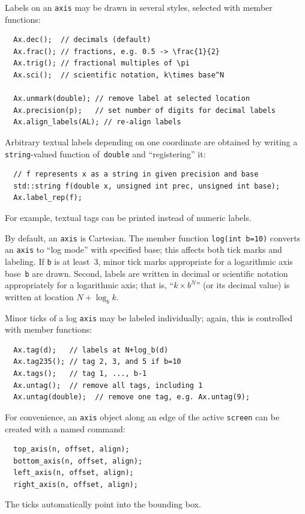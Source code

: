 \documentclass[12pt,letterpaper]{book}
\newcommand{\code}[1]{\texttt{#1}}
\newcommand{\teximath}[1]{$#1$}
\newcommand{\findex}[1]{\ignorespaces}
\begin{document}
Labels on an \code{axis} may be drawn in several styles, selected with
member functions:
\findex{axis.dec}
\findex{axis.frac}
\findex{axis.trig}
\findex{axis.sci}
\findex{axis.unmark}
\findex{axis.precision}
\findex{axis.align\_labels}
\begin{verbatim}
  Ax.dec();  // decimals (default)
  Ax.frac(); // fractions, e.g. 0.5 -> \frac{1}{2}
  Ax.trig(); // fractional multiples of \pi
  Ax.sci();  // scientific notation, k\times base^N

  Ax.unmark(double); // remove label at selected location
  Ax.precision(p);   // set number of digits for decimal labels
  Ax.align_labels(AL); // re-align labels
\end{verbatim}
Arbitrary textual labels depending on one coordinate are obtained by
writing a \code{string}-valued function of~\code{double} and
``registering'' it:
\findex{axis.label\_rep}
\begin{verbatim}
  // f represents x as a string in given precision and base
  std::string f(double x, unsigned int prec, unsigned int base);
  Ax.label_rep(f);
\end{verbatim}
For example, textual tags can be printed instead of numeric labels.

By default, an \code{axis} is Cartesian. The member function
\code{log(int b=10)} converts an \code{axis} to ``log mode'' with
specified base; this affects both tick marks and labeling. If \code{b}
is at least~3, minor tick marks appropriate for a logarithmic axis
base~\code{b} are drawn. Second, labels are written in decimal or
scientific notation appropriately for a logarithmic axis; that is,
``\teximath{k\times b^N}'' (or its decimal value) is written at
location \teximath{N+\log_b k}.

Minor ticks of a log \code{axis} may be labeled individually; again,
this is controlled with member functions:
\findex{axis.tag}
\findex{axis.tag235}
\findex{axis.tags}
\findex{axis.untag}
\begin{verbatim}
  Ax.tag(d);   // labels at N+log_b(d)
  Ax.tag235(); // tag 2, 3, and 5 if b=10
  Ax.tags();   // tag 1, ..., b-1
  Ax.untag();  // remove all tags, including 1
  Ax.untag(double);  // remove one tag, e.g. Ax.untag(9);
\end{verbatim}

For convenience, an \code{axis} object along an edge of the active
\code{screen} can be created with a named command:
\findex{top\_axis}
\findex{bottom\_axis}
\findex{left\_axis}
\findex{right\_axis}
\begin{verbatim}
  top_axis(n, offset, align);
  bottom_axis(n, offset, align);
  left_axis(n, offset, align);
  right_axis(n, offset, align);
\end{verbatim}
The ticks automatically point into the bounding box.
\end{document}
